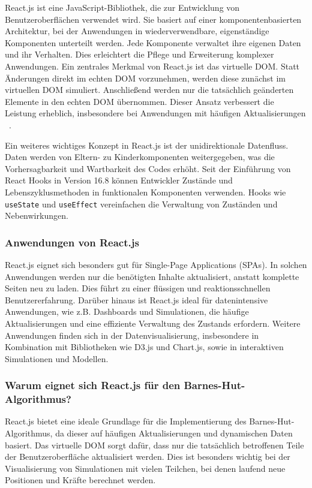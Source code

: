 \documentclass[a4paper,12pt,twoside]{article}
\begin{document}
React.js ist eine JavaScript-Bibliothek, die zur Entwicklung von Benutzeroberflächen verwendet wird. Sie basiert auf einer komponentenbasierten Architektur, bei der Anwendungen in wiederverwendbare, eigenständige Komponenten unterteilt werden. Jede Komponente verwaltet ihre eigenen Daten und ihr Verhalten. Dies erleichtert die Pflege und Erweiterung komplexer Anwendungen. Ein zentrales Merkmal von React.js ist das virtuelle DOM. Statt Änderungen direkt im echten DOM vorzunehmen, werden diese zunächst im virtuellen DOM simuliert. Anschließend werden nur die tatsächlich geänderten Elemente in den echten DOM übernommen. Dieser Ansatz verbessert die Leistung erheblich, insbesondere bei Anwendungen mit häufigen Aktualisierungen ~\cite{ReactJSTutorial}.

Ein weiteres wichtiges Konzept in React.js ist der unidirektionale Datenfluss. Daten werden von Eltern- zu Kinderkomponenten weitergegeben, was die Vorhersagbarkeit und Wartbarkeit des Codes erhöht. Seit der Einführung von React Hooks in Version 16.8 können Entwickler Zustände und Lebenszyklusmethoden in funktionalen Komponenten verwenden. Hooks wie \texttt{useState} und \texttt{useEffect} vereinfachen die Verwaltung von Zuständen und Nebenwirkungen.

\subsubsection{Anwendungen von React.js}
React.js eignet sich besonders gut für Single-Page Applications (SPAs). In solchen Anwendungen werden nur die benötigten Inhalte aktualisiert, anstatt komplette Seiten neu zu laden. Dies führt zu einer flüssigen und reaktionsschnellen Benutzererfahrung. Darüber hinaus ist React.js ideal für datenintensive Anwendungen, wie z.B. Dashboards und Simulationen, die häufige Aktualisierungen und eine effiziente Verwaltung des Zustands erfordern. Weitere Anwendungen finden sich in der Datenvisualisierung, insbesondere in Kombination mit Bibliotheken wie D3.js und Chart.js, sowie in interaktiven Simulationen und Modellen.

\subsubsection{Warum eignet sich React.js für den Barnes-Hut-Algorithmus?}
React.js bietet eine ideale Grundlage für die Implementierung des Barnes-Hut-Algorithmus, da dieser auf häufigen Aktualisierungen und dynamischen Daten basiert. Das virtuelle DOM sorgt dafür, dass nur die tatsächlich betroffenen Teile der Benutzeroberfläche aktualisiert werden. Dies ist besonders wichtig bei der Visualisierung von Simulationen mit vielen Teilchen, bei denen laufend neue Positionen und Kräfte berechnet werden.
\end{document}
